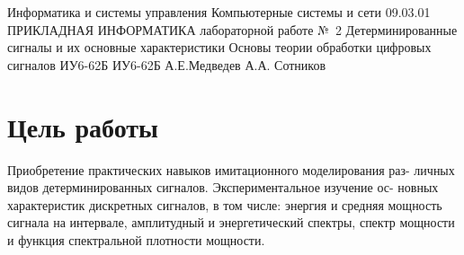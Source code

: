 \documentclass{bmstu}
\begin{document}



\makereporttitle
    {Информатика и системы управления} %
    {Компьютерные системы и сети} %
    {09.03.01 ПРИКЛАДНАЯ ИНФОРМАТИКА} %
    {лабораторной работе №~2} %
    {Детерминированные сигналы и их основные характеристики} %
    {Основы теории обработки цифровых сигналов} %
    {} %
    {ИУ6-62Б} %
    {
    	{ИУ6-62Б}
    	{А.Е.Медведев} %
    	{А.А. Сотников} %
    } 
    
\section*{Цель работы}
Приобретение практических навыков имитационного моделирования раз-
личных видов детерминированных сигналов. Экспериментальное изучение ос-
новных характеристик дискретных сигналов, в том числе: энергия и средняя
мощность сигнала на интервале, амплитудный и энергетический спектры, спектр
мощности и функция спектральной плотности мощности.
\end{document}
